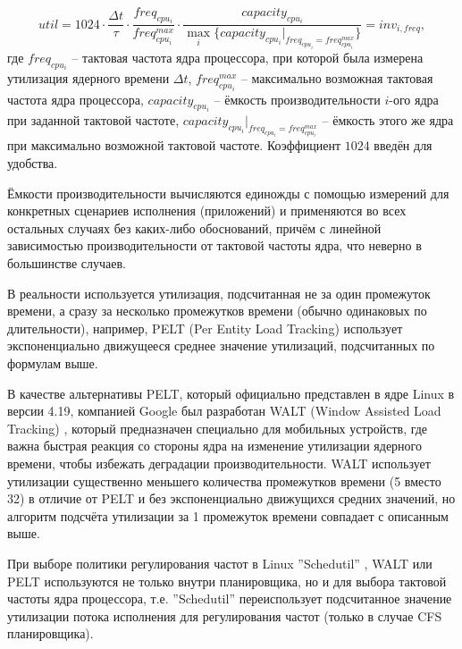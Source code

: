     \begin{equation} \label{util_linux_formula}
        util = 1024 \cdot \frac{\Delta t}{\tau} \cdot \frac{freq_{cpu_{i}}}{freq^{max}_{cpu_{i}}} \cdot
               \frac{capacity_{cpu_{i}}}{\max_i \{capacity_{cpu_{i}} |_{freq_{cpu_i} = freq_{cpu_i}^{max}}\}} =
            inv_{i, freq},
    \end{equation}
    где $freq_{cpu_{i}}$ -- тактовая частота ядра процессора, при которой была измерена утилизация
    ядерного времени $\Delta t$, $freq^{max}_{cpu_{i}}$ -- максимально возможная тактовая частота ядра
    процессора, $capacity_{cpu_{i}}$ -- ёмкость производительности $i$-ого ядра при заданной
    тактовой частоте, $capacity_{cpu_{i}} |_{freq_{cpu_i} = freq_{cpu_i}^{max}}$ -- ёмкость этого
    же ядра при максимально возможной тактовой частоте. Коэффициент $1024$ введён для удобства.

    Ёмкости производительности вычисляются единожды с помощью измерений для конкретных сценариев
    исполнения (приложений) и применяются во всех остальных случаях без каких-либо обоснований,
    причём с линейной зависимостью производительности от тактовой частоты ядра, что неверно
    в большинстве случаев.

    В реальности используется утилизация, подсчитанная не за один промежуток времени, а сразу за
    несколько промежутков времени (обычно одинаковых по длительности), например, PELT
    (Per Entity Load Tracking) \cite{KernelDocsSchedutil} использует экспоненциально движущееся
    среднее значение утилизаций, подсчитанных по формулам выше.

    В качестве альтернативы PELT, который официально представлен в ядре Linux в версии 4.19,
    компанией Google был разработан WALT (Window Assisted Load Tracking) \cite{QualcommWALT},
    который предназначен специально для мобильных устройств, где важна быстрая реакция со стороны ядра
    на изменение утилизации ядерного времени, чтобы избежать деградации производительности.
    WALT использует утилизации существенно меньшего количества промежутков времени (5 вместо 32) в
    отличие от PELT и без экспоненциально движущихся средних значений, но алгоритм подсчёта утилизации
    за 1 промежуток времени совпадает с описанным выше.

    При выборе политики регулирования частот в Linux ''Schedutil'' \cite{KernelDocsSchedutil},
    WALT или PELT используются не только внутри планировщика, но и для выбора тактовой частоты ядра
    процессора, т.е. ''Schedutil'' переиспользует подсчитанное значение утилизации потока исполнения
    для регулирования частот (только в случае CFS планировщика).

